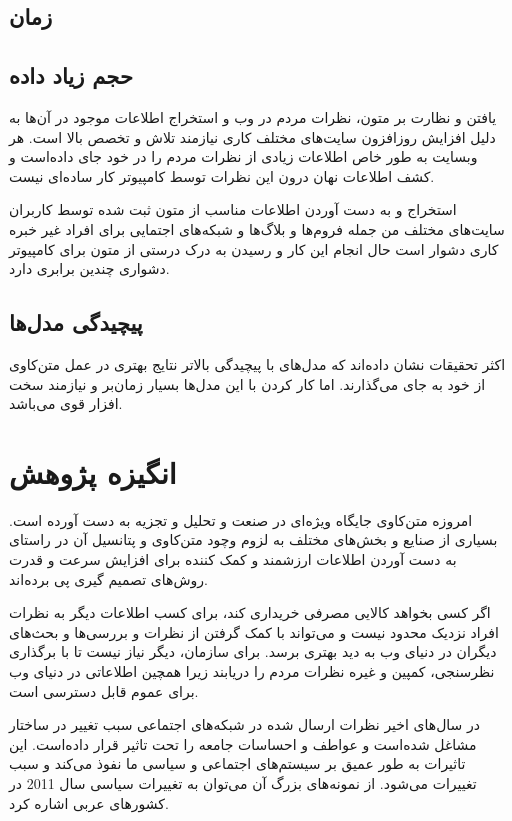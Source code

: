 \documentclass[12pt, a4paper, oneside]{report}
\begin{document}
\subsection{زمان}
\subsection{حجم زیاد داده}

یافتن و نظارت بر متون، نظرات مردم در وب و استخراج اطلاعات موجود در آن‌ها به دلیل افزایش روزافزون
سایت‌های مختلف کاری نیازمند تلاش و تخصص بالا است.
هر وبسایت به طور خاص اطلاعات زیادی از نظرات مردم را در خود جای داده‌است و کشف اطلاعات نهان
درون این نظرات توسط کامپیوتر کار ساده‌ای نیست.

استخراج و به دست آوردن اطلاعات مناسب از متون ثبت شده توسط کاربران سایت‌های مختلف من جمله
فروم‌ها و بلاگ‌ها و شبکه‌های اجتمایی برای افراد غیر خبره کاری دشوار است حال انجام این کار و رسیدن
به درک درستی از متون برای کامپیوتر دشواری چندین برابری دارد.
\cite{zhang2018deep}

\subsection{پیچیدگی مدل‌ها}

اکثر تحقیقات نشان داده‌اند که مدل‌های با پیچیدگی بالاتر نتایج بهتری در عمل متن‌کاوی از خود به جای می‌گذارند.
اما کار کردن با این مدل‌ها بسیار زمان‌بر و نیازمند سخت افزار قوی می‌باشد\cite{8844895}.

\section{انگیزه پژوهش}

امروزه متن‌کاوی جایگاه ویژه‌ای در صنعت و تحلیل و تجزیه به دست آورده است. بسیاری از صنایع
و بخش‌های مختلف به لزوم وچود متن‌کاوی و پتانسیل آن در راستای به دست آوردن اطلاعات ارزشمند
و کمک کننده برای افزایش سرعت و قدرت روش‌های تصمیم گیری پی برده‌اند\cite{8844895}.

اگر کسی بخواهد کالایی مصرفی خریداری کند، برای کسب اطلاعات دیگر به نظرات افراد نزدیک
محدود نیست و می‌تواند با کمک گرفتن از نظرات و بررسی‌ها و بحث‌های دیگران در دنیای وب به دید
بهتری برسد. برای سازمان، دیگر نیاز نیست تا با برگذاری نظرسنجی، کمپین و غیره نظرات مردم
را دریابند زیرا همچین اطلاعاتی در دنیای وب برای عموم قابل دسترسی است.

در سال‌های اخیر نظرات ارسال شده در شبکه‌های اجتماعی سبب تغییر در ساختار مشاغل شده‌است و
عواطف و احساسات جامعه را تحت تاثیر قرار داده‌است. این تاثیرات به طور عمیق بر سیستم‌های اجتماعی
و سیاسی ما نفوذ می‌کند و سبب تغییرات می‌شود. از نمونه‌های بزرگ آن می‌توان به تغییرات سیاسی سال
2011
در کشورهای عربی اشاره کرد.
\end{document}
